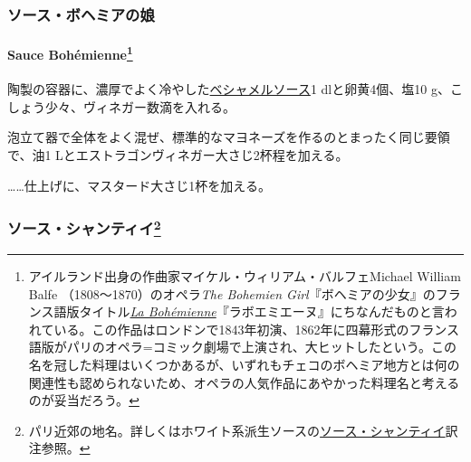 \begin{recette}
\maeaki

\hypertarget{ux30bdux30fcux30b9ux30dcux30d8ux30dfux30a2ux306eux5a18}{%
\subsubsection{ソース・ボヘミアの娘}\label{ux30bdux30fcux30b9ux30dcux30d8ux30dfux30a2ux306eux5a18}}

\hypertarget{sauce-bohemienne}{%
\paragraph[Sauce Bohémienne]{\texorpdfstring{Sauce Bohémienne\footnote{アイルランド出身の作曲家マイケル・ウィリアム・バルフェMichael
  William Balfe （1808〜1870）のオペラ\emph{The Bohemien
  Girl}『ボヘミアの少女』のフランス語版タイトル\href{https://archive.org/details/labohmiennegrand00balf}{\emph{La
  Bohémienne}}『ラボエミエーヌ』にちなんだものと言われている。この作品はロンドンで1843年初演、1862年に四幕形式のフランス語版がパリのオペラ=コミック劇場で上演され、大ヒットしたという。この名を冠した料理はいくつかあるが、いずれもチェコのボヘミア地方とは何の関連性も認められないため、オペラの人気作品にあやかった料理名と考えるのが妥当だろう。}}{Sauce Bohémienne}}\label{sauce-bohemienne}}


陶製の容器に、濃厚でよく冷やした\protect\hyperlink{sauce-bechamel}{ベシャメルソース}1\undemi{}
dlと卵黄4個、塩10 g、こしょう少々、ヴィネガー数滴を入れる。

泡立て器で全体をよく混ぜ、標準的なマヨネーズを作るのとまったく同じ要領で、油1
Lとエストラゴンヴィネガー大さじ2杯程を加える。

\ldots{}\ldots{}仕上げに、マスタード大さじ1杯を加える。

\maeaki

\hypertarget{ux30bdux30fcux30b9ux30b7ux30e3ux30f3ux30c6ux30a3ux30a47}{%
\subsubsection[ソース・シャンティイ]{\texorpdfstring{ソース・シャンティイ\footnote{パリ近郊の地名。詳しくはホワイト系派生ソースの\protect\hyperlink{sauce-chantilly}{ソース・シャンティイ}訳注参照。}}{ソース・シャンティイ}}\label{ux30bdux30fcux30b9ux30b7ux30e3ux30f3ux30c6ux30a3ux30a47}}


\end{recette}
